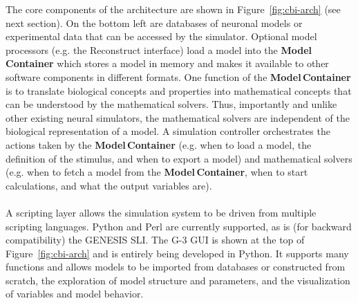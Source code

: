 \documentclass[10pt]{article}
\begin{document}
The core components of the architecture are shown in
Figure~\ref{fig:cbi-arch} (see next section). On the bottom left are
databases of neuronal models or experimental data that can be accessed
by the simulator. Optional model processors (e.g. the Reconstruct
interface) load a model into the {\bf Model\,Container} which stores a
model in memory and makes it available to other software components in
different formats.  One function of the {\bf Model\,Container} is to
translate biological concepts and properties into mathematical
concepts that can be understood by the mathematical solvers. Thus,
importantly and unlike other existing neural simulators, the
mathematical solvers are independent of the biological representation
of a model. A simulation controller orchestrates the actions taken by
the {\bf Model\,Container} (e.g. when to load a model, the definition
of the stimulus, and when to export a model) and mathematical solvers
(e.g. when to fetch a model from the {\bf Model\,Container}, when to
start
calculations, and what the output variables are).\\

 \\

A scripting layer allows the simulation system to be driven from
multiple scripting languages. Python and Perl are currently supported,
as is (for backward compatibility) the GENESIS SLI. The G-3 GUI is shown at the top of
Figure~\ref{fig:cbi-arch} and is entirely being developed in Python.  It supports many functions and
allows models to be imported from databases or constructed from
scratch, the exploration of model structure and parameters, and the
visualization of variables and model behavior.
\end{document}
